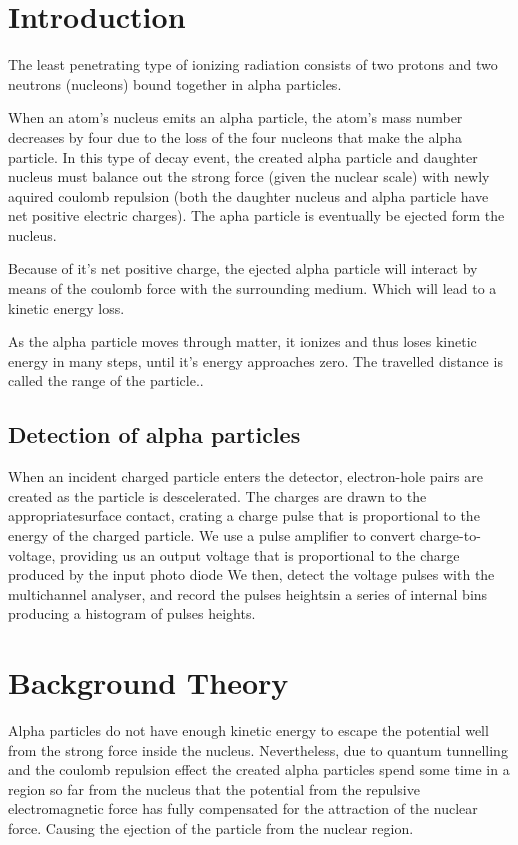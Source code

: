 \documentclass[a4paper]{article}
\begin{document}
\section{Introduction}
\begin{multicols}{2}

The least penetrating type of ionizing radiation consists of two protons and two neutrons (nucleons) bound together in alpha particles.\cite{SPA, alpha}

When an atom's nucleus emits an alpha particle, the atom's mass number decreases by four due to the loss of the four nucleons that make the alpha particle\cite{alpha}. 
In this type of decay event, the created alpha particle and daughter nucleus must balance out the strong force (given the nuclear scale) with newly aquired coulomb repulsion (both the daughter nucleus and alpha particle have net positive electric charges). The apha particle is eventually be ejected form the nucleus.

Because of it's net positive charge, the ejected alpha particle will interact by means of the coulomb force with the surrounding medium. Which will lead to a kinetic energy loss.\cite{SPA}

As the alpha particle moves through matter, it ionizes and thus loses kinetic energy in many steps, until it's energy approaches zero. The travelled distance is called the range of the particle.\cite{straggling}.
\subsection{Detection of alpha particles}
When an incident charged particle enters the detector, electron-hole pairs are created as the particle is descelerated. The charges are drawn to the appropriatesurface contact, crating a charge pulse that is proportional to the energy of the charged particle.\cite{SPA}
We use a pulse amplifier to convert charge-to-voltage, providing us an output voltage that is proportional to the charge produced by the input photo diode\cite{SPA}
We then, detect the voltage pulses with the multichannel analyser, and record the pulses heightsin a series of internal bins producing a histogram of pulses heights.\cite{SPA}

\section{Background Theory}
 Alpha particles do not have enough kinetic energy to escape the potential well from the strong force inside the nucleus. Nevertheless, due to quantum tunnelling and the coulomb repulsion effect the created alpha particles spend some time in a region so far from the nucleus that the potential from the repulsive electromagnetic force has fully compensated for the attraction of the nuclear force\cite{alpha}. 
Causing the ejection of the particle from the nuclear region.  
 

\end{multicols}
\end{document}
